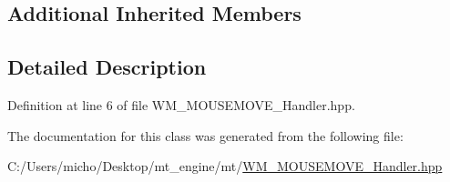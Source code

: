 \subsection*{Additional Inherited Members}


\subsection{Detailed Description}


Definition at line 6 of file W\+M\+\_\+\+M\+O\+U\+S\+E\+M\+O\+V\+E\+\_\+\+Handler.\+hpp.



The documentation for this class was generated from the following file\+:\begin{DoxyCompactItemize}
\item 
C\+:/\+Users/micho/\+Desktop/mt\+\_\+engine/mt/\hyperlink{_w_m___m_o_u_s_e_m_o_v_e___handler_8hpp}{W\+M\+\_\+\+M\+O\+U\+S\+E\+M\+O\+V\+E\+\_\+\+Handler.\+hpp}\end{DoxyCompactItemize}

